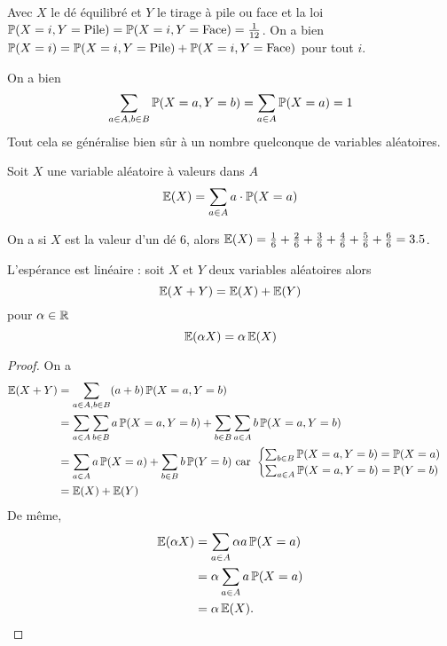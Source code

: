 \begin{ex}
Avec $X$ le dé équilibré et $Y$ le tirage à pile ou face et la loi
$\operatorname{\mathbb P}(X = i, Y = \text{Pile}) = \operatorname{\mathbb P}(X = i, Y = \text{Face}) = \frac1{12}$.
On a bien $\operatorname{\mathbb P}(X = i) = \operatorname{\mathbb P}(X = i, Y = \text{Pile}) + \operatorname{\mathbb P}(X = i, Y = \text{Face})$
pour tout $i$.
\end{ex}

\begin{rem}
On a bien
$$\sum_{a\in A, b\in B}\operatorname{\mathbb P}(X = a, Y = b) = \sum_{a\in A}\operatorname{\mathbb P}(X = a) = 1$$
Tout cela se généralise bien sûr à un nombre quelconque de variables aléatoires.
\end{rem}


\begin{dfn}[Espérance]
Soit $X$ une variable aléatoire à valeurs dans $A$
$$\operatorname{\mathbb E}(X) = \sum_{a\in A}a \cdot \operatorname{\mathbb P}(X = a)$$
\end{dfn}

\begin{ex}
On a si $X$ est la valeur d'un dé $6$, alors $\operatorname{\mathbb E}(X) = \frac16 + \frac26 + \frac36 + \frac46 + \frac56 + \frac66 = 3.5$.
\end{ex}


\begin{pro}
L'espérance est linéaire : soit $X$ et $Y$ deux variables aléatoires
alors
$$\operatorname{\mathbb E}(X + Y) = \operatorname{\mathbb E}(X) + \operatorname{\mathbb E}(Y)$$
pour $\alpha\in\mathbb R$
$$\operatorname{\mathbb E}(\alpha X) = \alpha\operatorname{\mathbb E}(X)$$
\end{pro}

\begin{proof}
On a
\begin{align*}
\operatorname{\mathbb E}(X + Y) & = \sum_{a\in A, b\in B}(a + b)\operatorname{\mathbb P}(X = a, Y = b) \\
& = \sum_{a\in A}\sum_{b\in B}a\operatorname{\mathbb P}(X = a, Y = b) + \sum_{b\in B}\sum_{a\in A}b\operatorname{\mathbb P}(X = a, Y = b) \\
& = \sum_{a\in A}a\operatorname{\mathbb P}(X = a) + \sum_{b\in B}b\operatorname{\mathbb P}(Y = b) \text{ car } \begin{cases} \sum_{b\in B}\operatorname{\mathbb P}(X = a, Y = b) = \operatorname{\mathbb P}(X = a) \\ \sum_{a\in A}\operatorname{\mathbb P}(X = a, Y = b) = \operatorname{\mathbb P}(Y = b)\end{cases} \\
& = \operatorname{\mathbb E}(X) + \operatorname{\mathbb E}(Y)
\end{align*}
De même,
\begin{align*}
\operatorname{\mathbb E}(\alpha X)
& = \sum_{a\in A}\alpha a\operatorname{\mathbb P}(X = a) \\
& = \alpha \sum_{a\in A}a\operatorname{\mathbb P}(X = a) \\
& = \alpha\operatorname{\mathbb E}(X).
\end{align*}
\end{proof}

